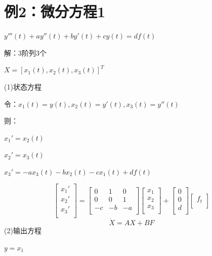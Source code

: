 \documentclass[UTF8]{ctexart}
\begin{document}
\section{例2：微分方程1}
$y'''(t)+ay''(t)+by'(t)+cy(t)=df(t)$  \par
解：3阶列3个  \par
\qquad $X=[x_1(t),x_2(t),x_3(t)]^T$  \par
(1)状态方程 \par
令：$x_1(t)=y(t),x_2(t)=y'(t),x_3(t)=y''(t)$  \par
则：\par
\qquad $x_1'=x_2(t)$  \par
\qquad $x_2'=x_3(t)$  \par
\qquad $x_3'=-ax_3(t)-bx_2(t)-cx_1(t)+df(t)$  \par
\begin{equation}
        \left[   
           \begin{matrix}
           x_1' \\
           x_2' \\
           x_3' \\
           \end{matrix}
         \right]
         =  \left[   
           \begin{matrix}
           0 &  1 & 0  \\
           0 &  0 & 1  \\
           -c & -b & -a  \\
           \end{matrix}
         \right]
         \left[   
          \begin{matrix}
          x_1 \\
          x_2 \\
          x_3 \\
          \end{matrix}
        \right]
        +\left[   
          \begin{matrix}
          0 \\
          0 \\
          d \\
          \end{matrix}
        \right]
        \left[   
          \begin{matrix}
          f_t \\
          \end{matrix}
        \right]
        \nonumber
       \end{equation}
\begin{equation}
        \dot{X} = AX+ BF
\nonumber
\end{equation}
(2)输出方程 \par
 $y=x_1$  \par
\end{document}
